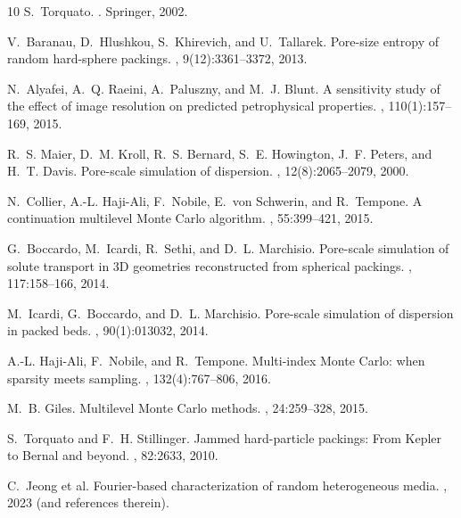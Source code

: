 \documentclass[preprint,12pt]{elsarticle}
\begin{document}
\begin{thebibliography}{10}
S.~Torquato.
.
\newblock Springer, 2002.

V.~Baranau, D.~Hlushkou, S.~Khirevich, and U.~Tallarek.
\newblock Pore-size entropy of random hard-sphere packings.
, 9(12):3361--3372, 2013.

N.~Alyafei, A.~Q. Raeini, A.~Paluszny, and M.~J. Blunt.
\newblock A sensitivity study of the effect of image resolution on predicted petrophysical properties.
, 110(1):157--169, 2015.

R.~S. Maier, D.~M. Kroll, R.~S. Bernard, S.~E. Howington, J.~F. Peters, and H.~T. Davis.
\newblock Pore-scale simulation of dispersion.
, 12(8):2065--2079, 2000.

N.~Collier, A.-L. Haji-Ali, F.~Nobile, E.~von Schwerin, and R.~Tempone.
\newblock A continuation multilevel Monte Carlo algorithm.
, 55:399--421, 2015.

G.~Boccardo, M.~Icardi, R.~Sethi, and D.~L. Marchisio.
\newblock Pore-scale simulation of solute transport in 3D geometries reconstructed from spherical packings.
, 117:158--166, 2014.

M.~Icardi, G.~Boccardo, and D.~L. Marchisio.
\newblock Pore-scale simulation of dispersion in packed beds.
, 90(1):013032, 2014.

A.-L. Haji-Ali, F.~Nobile, and R.~Tempone.
\newblock Multi-index Monte Carlo: when sparsity meets sampling.
, 132(4):767--806, 2016.

M.~B. Giles.
\newblock Multilevel Monte Carlo methods.
, 24:259--328, 2015.

S.~Torquato and F.~H. Stillinger.
\newblock Jammed hard-particle packings: From Kepler to Bernal and beyond.
, 82:2633, 2010.

C.~Jeong et al.
\newblock Fourier-based characterization of random heterogeneous media.
, 2023 (and references therein).


\end{thebibliography}
\end{document}
